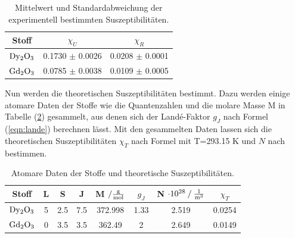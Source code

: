 \begin{table}
    \centering
    \begin{tabular}{c c c}
        \toprule
        {Stoff} & {$\chi_U $} & {$\chi_R $} \\
    \midrule
    $\ce{Dy2O3}$ & 0.1730 $\pm$ 0.0026  &  0.0208 $\pm$ 0.0001 \\
    $\ce{Gd2O3}$ & 0.0785 $\pm$ 0.0038  & 0.0109  $\pm$ 0.0005 \\
    \bottomrule
\end{tabular}
\caption{Mittelwert und Standardabweichung der experimentell bestimmten Suszeptibilitäten.}
\label{tab:expsus}
\end{table}

\newpage
\noindent
Nun werden die theoretischen Suszeptibilitäten bestimmt.
Dazu werden einige atomare Daten der Stoffe wie die Quantenzahlen und die molare Masse M in Tabelle (\ref{tab:th1}) gesammelt, aus denen sich der Landé-Faktor $g_J$ nach Formel (\ref{eqn:lande})
berechnen lässt.
Mit den gesammelten Daten lassen sich die theoretischen Suszeptibilitäten $\chi_T$ nach Formel mit T=293.15 K und $N$ nach bestimmen. %


\begin{table}
    \centering
    \begin{tabular}{c c c c c c c c}
        \toprule
        {Stoff} & {L} & {S} & {J} & {M $\mathbin{/} \si[per-mode=fraction]{\gram\per\mol}$ } & {$g_J$} & {N $\cdot 10^{28} \mathbin{/} \si[per-mode=fraction]{\per\cubic\meter} $} & {$\chi_T$} \\
    \midrule
    $\ce{Dy2O3}$ & 5 & 2.5 & 7.5 & 372.998 & 1.33 & 2.519 & 0.0254 \\
    $\ce{Gd2O3}$ & 0 & 3.5 & 3.5 & 362.49  & 2    & 2.649 & 0.0149 \\
    \bottomrule
\end{tabular}
\caption{Atomare Daten der Stoffe und theoretische Suszeptibilitäten.}
\label{tab:th1}
\end{table}